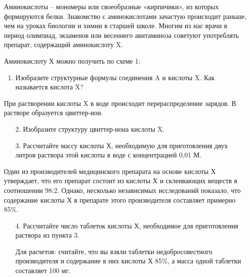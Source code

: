 
Аминокислоты – мономеры или своеобразные «кирпичики», из которых формируются белки. Знакомство с 
аминокислотами зачастую происходит раньше, чем на уроках биологии и химии в старшей школе. Многим 
из нас врачи в период олимпиад, экзаменов или весеннего авитаминоза советуют употреблять препарат, 
содержащий аминокислоту X. 

Аминокислоту Х можно получить по схеме 1:

\begin{enumerate}
    \item Изобразите структурные формулы соединения A и кислоты X. Как называется кислота X?
\end{enumerate} 

При растворении кислоты X в воде происходит перераспределение зарядов. В растворе образуется цвиттер-ион.
    
\begin{enumerate}    
    \item[2.] Изобразите структуру цвиттер-иона кислоты X.
    \item[3.] Рассчитайте массу кислоты Х, необходимую для приготовления двух литров раствора этой кислоты в воде с концентрацией 0,01 М.
\end{enumerate}    

Один из производителей медицинского препарата на основе кислоты Х утверждает, что его препарат состоит из кислоты Х и склеивающих веществ в соотношении 98:2. Однако, несколько независимых исследований показало, что содержание кислоты Х в препарате этого производителя составляет примерно 85\%.
    
\begin{enumerate}
    \item[4.] Рассчитайте число таблеток кислоты Х, необходимое для приготовления раствора из пункта 3. 

    Для расчетов: считайте, что вы взяли таблетки недобросовестного производителя и содержание в них кислоты Х 85\%, а масса одной таблетки составляет 100 мг.
\end{enumerate}
